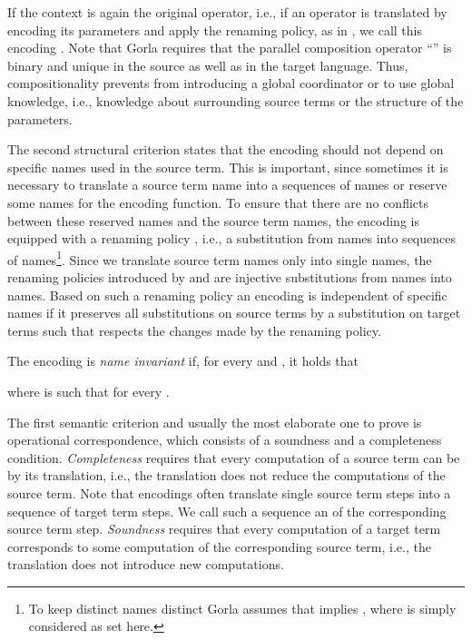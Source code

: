 \documentclass[]{llncs}
\begin{document}
\noindent
If the context is again the original operator, i.e., if an operator is translated by encoding its parameters and apply the renaming policy, as in , we call this encoding \emph{\clean}. Note that Gorla requires that the parallel composition operator ``'' is binary and unique in the source as well as in the target language. Thus, compositionality prevents from introducing a global coordinator or to use global knowledge, i.e., knowledge about surrounding source terms or the structure of the parameters.

The second structural criterion states that the encoding should not depend on specific names used in the source term. This is important, since sometimes it is necessary to translate a source term name into a sequences of names or reserve some names for the encoding function. To ensure that there are no conflicts between these reserved names and the source term names, the encoding is equipped with a renaming policy , i.e., a substitution from names into sequences of names\footnote{To keep distinct names distinct Gorla assumes that  implies , where  is simply considered as set here.}. Since we translate source term names only into single names, the renaming policies introduced by  and  are injective substitutions from names into names. Based on such a renaming policy an encoding is independent of specific names if it preserves all substitutions  on source terms by a substitution  on target terms such that  respects the changes made by the renaming policy.

\begin{definition}
\label{def:nameInvariance}
	The encoding  is \emph{name invariant} if, for every  and , it holds that
	
	where  is such that  for every .
\end{definition}

The first semantic criterion and usually the most elaborate one to prove is operational correspondence, which consists of a soundness and a completeness condition. \emph{Completeness} requires that every computation of a source term can be \simulated by its translation, i.e., the translation does not reduce the computations of the source term. Note that encodings often translate single source term steps into a sequence of target term steps. We call such a sequence an \emph{\simulation}\!\! of the corresponding source term step. \emph{Soundness} requires that every computation of a target term corresponds to some computation of the corresponding source term, i.e., the translation does not introduce new computations.
\end{document}
